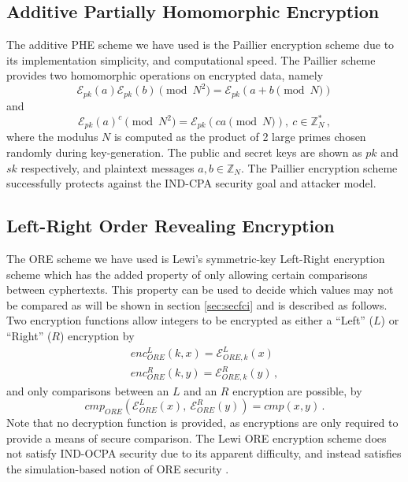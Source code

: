 \documentclass[letterpaper, 10 pt, conference]{ieeeconf}  %
\begin{document}
\subsection{Additive Partially Homomorphic Encryption} \label{subsec:paillier}
The additive PHE scheme we have used is the Paillier encryption scheme \cite{paillierPublicKeyCryptosystemsBased1999} due to its implementation simplicity, and computational speed. The Paillier scheme provides two homomorphic operations on encrypted data, namely 
\begin{equation}
   \mathcal{E}_{pk}(a)\mathcal{E}_{pk}(b) \pmod{N^{2}} = \mathcal{E}_{pk}(a + b \pmod{N}) \label{eqn:paillier_add}
\end{equation}
and
\begin{equation}
   \mathcal{E}_{pk}(a)^c \pmod{N^{2}} = \mathcal{E}_{pk}(ca \pmod{N}),\ c \in \mathbb{Z}^*_N\,, \label{eqn:paillier_mult}
\end{equation}
where the modulus $N$ is computed as the product of 2 large primes chosen randomly during key-generation. The public and secret keys are shown as $pk$ and $sk$ respectively, and plaintext messages $a,b \in \mathbb{Z}_N$. The Paillier encryption scheme successfully protects against the IND-CPA security goal and attacker model.

\subsection{Left-Right Order Revealing Encryption} \label{subsec:lewi}
The ORE scheme we have used is Lewi's symmetric-key Left-Right encryption scheme \cite{lewiOrderRevealingEncryptionNew2016} which has the added property of only allowing certain comparisons between cyphertexts. This property can be used to decide which values may not be compared as will be shown in section \ref{sec:secfci} and is described as follows. Two encryption functions allow integers to be encrypted as either a ``Left'' ($L$) or ``Right'' ($R$) encryption by
\begin{equation}
   \begin{gathered} \label{eqn:lewi_l_r}
      enc^L_{ORE}(k, x) = \mathcal{E}^L_{ORE,k}(x) \\
      enc^R_{ORE}(k, y) = \mathcal{E}^R_{ORE,k}(y)\,,
   \end{gathered}
\end{equation}
and only comparisons between an $L$ and an $R$ encryption are possible, by
\begin{equation}
   cmp_{ORE}(\mathcal{E}^L_{ORE}(x),\ \mathcal{E}^R_{ORE}(y)) = cmp(x, y)\,. \label{eqn:lewi_cmp}
\end{equation}
Note that no decryption function is provided, as encryptions are only required to provide a means of secure comparison. The Lewi ORE encryption scheme does not satisfy IND-OCPA security due to its apparent difficulty, and instead satisfies the simulation-based notion of ORE security \cite{lewiOrderRevealingEncryptionNew2016,chenettePracticalOrderRevealingEncryption2016}.
\end{document}
